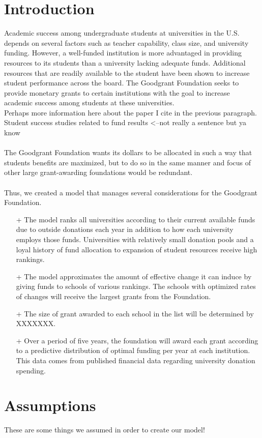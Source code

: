 \documentclass[paper.tex]{subfiles}
\begin{document}
	\section{Introduction}
	Academic success among undergraduate students at universities in the U.S. depends on several factors such as teacher capability, class size, and university funding. However, a well-funded institution is more advantaged in providing resources to its students than a university lacking adequate funds. Additional resources that are readily available to the student have been shown to increase student performance across the board.\cite{greenwald1996effect} The Goodgrant Foundation seeks to provide monetary grants to certain institutions with the goal to increase academic success among students at these universities. 
	\\ Perhaps more information here about the paper I cite in the previous paragraph. Student success studies related to fund results <--not really a sentence but ya know
	\\\\
	The Goodgrant Foundation wants its dollars to be allocated in such a way that students benefits are maximized, but to do so in the same manner and focus of other large grant-awarding foundations would be redundant. 
	\\\\
	Thus, we created a model that manages several considerations for the Goodgrant Foundation. 
	\begin{itemize} 
		\item[+] The model ranks all universities according to their current available funds due to outside donations each year in addition to how each university employs those funds. Universities with relatively small donation pools and a loyal history of fund allocation to expansion of student resources receive high rankings.
		\item[+] The model approximates the amount of effective change it can induce by giving funds to schools of various rankings. The schools with optimized rates of changes will receive the largest grants from the Foundation.
		\item[+] The size of grant awarded to each school in the list will be determined by XXXXXXX.
		\item[+] Over a period of five years, the foundation will award each grant according to a predictive distribution of optimal funding per year at each institution. This data comes from published financial data regarding university donation spending.
	\end{itemize}
	
	
	\section{Assumptions}
	These are some things we assumed in order to create our model!
\end{document}
